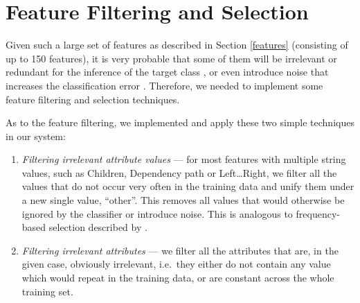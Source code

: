 \documentclass[12pt,notitlepage,a4paper]{report}
\begin{document}
\section{Feature Filtering and Selection}\label{featsel}

Given such a large set of features as described in Section \ref{features} (consisting of up to 150 features), it is very probable that some of them will be irrelevant or redundant for the inference of the target class \citep{john94}, or even introduce noise that increases the classification error \citep[p.~251]{manning08}. Therefore, we needed to implement some feature filtering and selection techniques.

As to the feature filtering, we implemented and apply these two simple techniques in our system:
\begin{enumerate}
    \item \emph{Filtering irrelevant attribute values} --- for most features with multiple string values, such as Children, Dependency path or Left\dots Right, we filter all the values that do not occur very often in the training data and unify them under a new single value, ``other''. This removes all values that would otherwise be ignored by the classifier or introduce noise. This is analogous to frequency-based selection described by \citet[p.~257]{manning08}.
    \item \emph{Filtering irrelevant attributes} --- we filter all the attributes that are, in the given case, obviously irrelevant, i.e.\ they either do not contain any value which would repeat in the training data, or are constant across the whole training set.
\end{enumerate}
\end{document}
